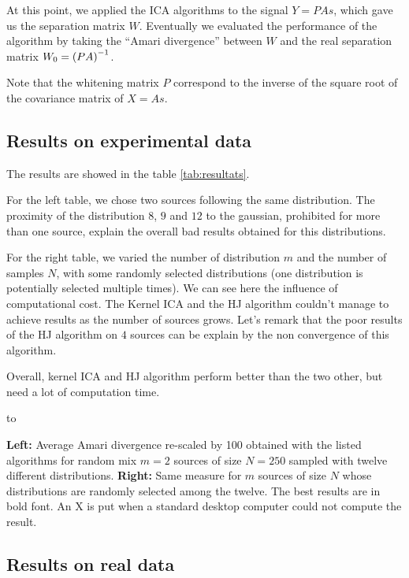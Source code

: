 \documentclass[a4paper]{article}
\begin{document}
At this point, we applied the ICA algorithms to the signal $Y = PAs$, which gave us the separation matrix $W$.
Eventually we evaluated the performance of the algorithm by taking the ``Amari divergence'' between $W$ and the real separation matrix $W_0 = \zp{PA}^{-1}$.

Note that the whitening matrix $P$ correspond to the inverse of the square root of the covariance matrix of $X=As$.

\subsection{Results on experimental data}

The results are showed in the table \ref{tab:resultats}.

For the left table, we chose two sources following the same distribution.
The proximity of the distribution $8$, $9$ and $12$ to the gaussian, prohibited
for more than one source, explain the overall bad results obtained for this
distributions.

For the right table, we varied the number of distribution $m$ and the number of
samples $N$, with some randomly selected distributions (one distribution is
potentially selected multiple times). We can see here the influence of
computational cost. The Kernel ICA and the HJ algorithm couldn't manage to
achieve results as the number of sources grows. Let's remark that the poor results of the HJ algorithm on $4$ sources can be explain by the non convergence of this algorithm.


Overall, kernel ICA and HJ algorithm perform better than the two other, but
need a lot of computation time.

\begin{table}
\centering
\hbox to \textwidth{\hspace{-.5cm}
\resizebox{.45\textwidth}{2cm}{}\hss
\resizebox{.55\textwidth}{2cm}{}
}
\caption{\textbf{Left:} Average Amari divergence re-scaled by 100 obtained with the listed algorithms for random mix $m=2$ sources of size $N=250$ sampled with twelve different distributions. \textbf{Right:} Same measure for $m$ sources of size $N$ whose distributions are randomly selected among the twelve. The best results are in bold font. An X is put when a standard desktop computer could not compute the result.\label{tab:resultats}}
\end{table}

\subsection{Results on real data}
\end{document}
